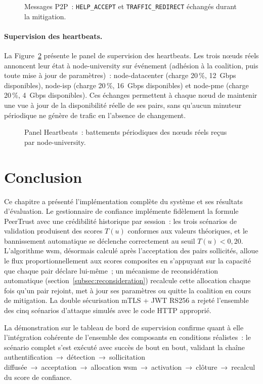 \begin{figure}[H]
\centering
{}
\caption{Messages P2P~: \texttt{HELP\_ACCEPT} et \texttt{TRAFFIC\_REDIRECT} échangés durant la mitigation.}
\label{fig:cap_messages}
\end{figure}

\paragraph{Supervision des heartbeats.}
La Figure~\ref{fig:cap_heartbeats} présente le panel de supervision des heartbeats. Les trois nœuds réels annoncent leur état à node-university sur événement (adhésion à la coalition, puis toute mise à jour de paramètres)~: node-datacenter (charge 20\,\%, 12~Gbps disponibles), node-isp (charge 20\,\%, 16~Gbps disponibles) et node-pme (charge 20\,\%, 4~Gbps disponibles). Ces échanges permettent à chaque nœud de maintenir une vue à jour de la disponibilité réelle de ses pairs, sans qu'aucun minuteur périodique ne génère de trafic en l'absence de changement.

\begin{figure}[H]
\centering
{}
\caption{Panel Heartbeats~: battements périodiques des nœuds réels reçus par node-university.}
\label{fig:cap_heartbeats}
\end{figure}

\section{Conclusion}

Ce chapitre a présenté l'implémentation complète du système et ses résultats d'évaluation. Le gestionnaire de confiance implémente fidèlement la formule PeerTrust avec une crédibilité historique par session~: les trois scénarios de validation produisent des scores $T(u)$ conformes aux valeurs théoriques, et le bannissement automatique se déclenche correctement au seuil $T(u) < 0{,}20$. L'algorithme \gls{wsm}, désormais calculé après l'acceptation des pairs sollicités, alloue le flux proportionnellement aux scores composites en s'appuyant sur la capacité que chaque pair déclare lui-même~; un mécanisme de reconsidération automatique (section~\ref{subsec:reconsideration}) recalcule cette allocation chaque fois qu'un pair rejoint, met à jour ses paramètres ou quitte la coalition en cours de mitigation. La double sécurisation mTLS + JWT RS256 a rejeté l'ensemble des cinq scénarios d'attaque simulés avec le code HTTP approprié.

La démonstration sur le tableau de bord de supervision confirme quant à elle l'intégration cohérente de l'ensemble des composants en conditions réalistes~: le scénario complet s'est exécuté avec succès de bout en bout, validant la chaîne authentification~→~détection~→~sollicitation diffusée~→~acceptation~→~allocation \gls{wsm}~→~activation~→~clôture~→~recalcul du score de confiance.
